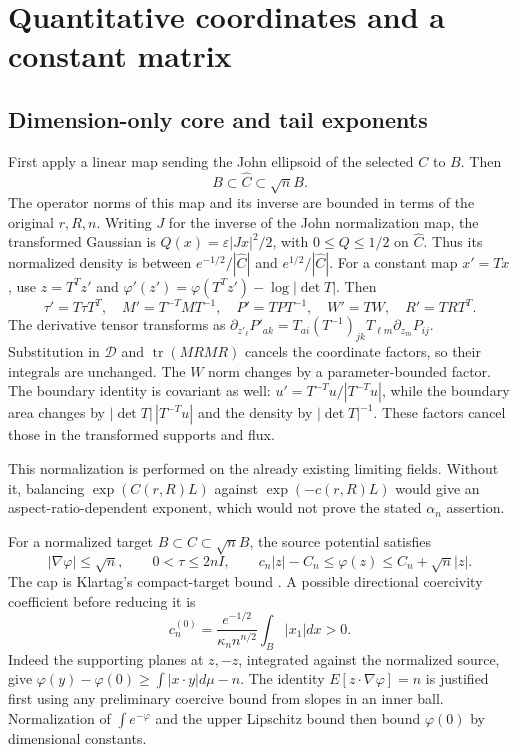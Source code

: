 \documentclass[11pt,reqno]{amsart}
\numberwithin{equation}{section}
\theoremstyle{remark}
\DeclareMathOperator{\tr}{tr}
\theoremstyle{definition}
\begin{document}
\section{Quantitative coordinates and a constant matrix}

\subsection{Dimension-only core and tail exponents}

First apply a linear map sending the John ellipsoid of the selected \(C\) to \(B\). Then
\[
B\subset \widehat C\subset\sqrt n B.
\]
The operator norms of this map and its inverse are bounded in terms of the original \(r,R,n\). Writing $J$ for the inverse of the John normalization map, the transformed Gaussian is \(Q(x)=\varepsilon|Jx|^2/2\), with \(0\le Q\le1/2\) on \(\widehat C\). Thus its normalized density is between \(e^{-1/2}/|\widehat C|\) and \(e^{1/2}/|\widehat C|\). For a constant map $x'=Tx$, use $z=T^Tz'$ and
$\varphi'(z')=\varphi(T^Tz')-\log|\det T|$. Then
\[
 \tau'=T\tau T^T,\quad M'=T^{-T}MT^{-1},\quad
 P'=TPT^{-1},\quad W'=TW,\quad R'=TRT^T.
\]
The derivative tensor transforms as
$\partial_{z'_\ell}P'_{ak}=T_{ai}(T^{-1})_{jk}T_{\ell m}\partial_{z_m}P_{ij}$.
Substitution in $\mathscr D$ and $\tr(MRMR)$ cancels the coordinate
factors, so their integrals are unchanged. The $W$ norm changes by a
parameter-bounded factor. The boundary identity is covariant as well:
$u'=T^{-T}u/|T^{-T}u|$, while the boundary area changes by
$|\det T|\,|T^{-T}u|$ and the density by $|\det T|^{-1}$.
These factors cancel those in the transformed supports and flux.

This normalization is performed on the already existing limiting fields. Without it, balancing \(\exp(C(r,R)L)\) against \(\exp(-c(r,R)L)\) would give an aspect-ratio-dependent exponent, which would not prove the stated \(\alpha_n\) assertion.

For a normalized target \(B\subset C\subset\sqrt n B\), the source potential satisfies
\[
|\nabla\varphi|\le\sqrt n,\qquad
0<\tau\le2nI,\qquad
c_n|z|-C_n\le\varphi(z)\le C_n+\sqrt n|z|.             \tag{4.1}
\]
The cap is Klartag's compact-target bound \cite[Theorem 1]{Klartag}. A possible directional coercivity coefficient before reducing it is
\[
c_n^{(0)}=
\frac{e^{-1/2}}{\kappa_n n^{n/2}}\int_{B}|x_1|dx>0.
\]
Indeed the supporting planes at \(z,-z\), integrated against the normalized source, give
\(\varphi(y)-\varphi(0)\ge\int|x\cdot y|d\mu-n\).
The identity \(E[z\cdot\nabla\varphi]=n\) is justified first using any preliminary coercive bound from slopes in an inner ball. Normalization of \(\int e^{-\varphi}\) and the upper Lipschitz bound then bound \(\varphi(0)\) by dimensional constants.
\end{document}
